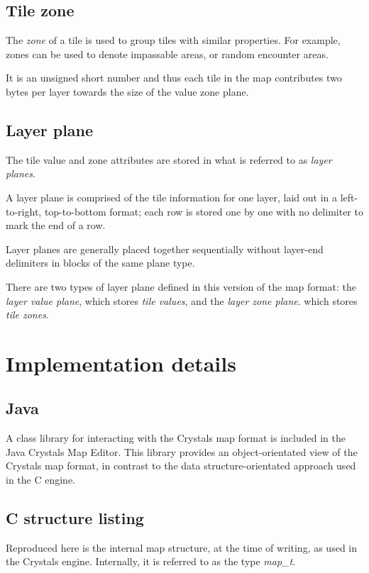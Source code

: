 \documentclass [12pt,a4paper]{article}
\begin{document}
\subsection{Tile zone}

The \emph{zone} of a tile is used to group tiles with similar
properties.  For example, zones can be used to denote impassable
areas, or random encounter areas.

It is an unsigned short number and thus each tile in the map
contributes two bytes per layer towards the size of the value zone
plane.


\subsection{Layer plane}

The tile value and zone attributes are stored in what is referred to
as \emph{layer planes}.

A layer plane is comprised of the tile information for one layer, laid
out in a left-to-right, top-to-bottom format; each row is stored one
by one with no delimiter to mark the end of a row.

Layer planes are generally placed together sequentially without
layer-end delimiters in blocks of the same plane type.

There are two types of layer plane defined in this version of the map
format: the \emph{layer value plane}, which stores \emph{tile
  values}, and the \emph{layer zone plane}. which stores \emph{tile
  zones}.


\section{Implementation details}

\subsection{Java}

A class library for interacting with the Crystals map format is
included in the Java Crystals Map Editor.  This library provides an
object-orientated view of the Crystals map format, in contrast to the
data structure-orientated approach used in the C engine.

\subsection{C structure listing}

Reproduced here is the internal map structure, at the time of writing,
as used in the Crystals engine.  Internally, it is referred to as the
type \emph{map\_t}.
\end{document}
